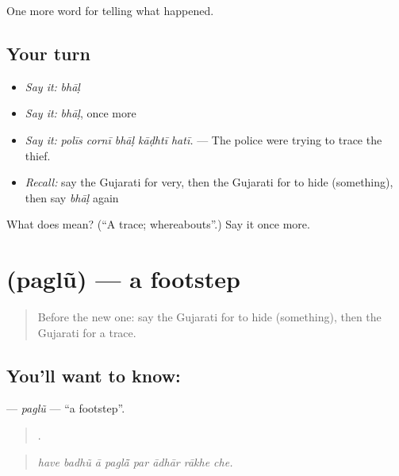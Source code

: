\begin{grammarlens}[title={What you've built}]
One more word for telling what happened.
\end{grammarlens}

\subsection*{Your turn}
\begin{itemize}
\raggedright
  \item \emph{Say it:} \emph{bhāḷ}
  \item \emph{Say it:} \emph{bhāḷ}, once more
  \item \emph{Say it:} \emph{polīs cornī bhāḷ kāḍhtī hatī.} — The police were trying to trace the thief.
  \item \emph{Recall:} say the Gujarati for very, then the Gujarati for to hide (something), then say \emph{bhāḷ} again
\end{itemize}

\begin{tcolorbox}[breakable,colback=teal!4,colframe=teal!35!black,title={Before you move on}]
What does  mean? (\textquotedblleft{}A trace; whereabouts\textquotedblright{}.) Say it once more.
\end{tcolorbox}
\section[\texorpdfstring{\gu{પગલું} (paglũ)}{પગલું (paglũ)}]{ (paglũ) — a footstep}

\label{lesson:GU-C287-paglu}



\begin{quote}
Before the new one: say the Gujarati for to hide (something), then the Gujarati for a trace.
\end{quote}

\subsection*{You'll want to know: }
\textbf{} — \emph{paglũ} — \textquotedblleft{}a footstep\textquotedblright{}.

\begin{quote}
       .
\end{quote}

\begin{quote}
\emph{have badhũ ā paglā̃ par ādhār rākhe che.}
\end{quote}


